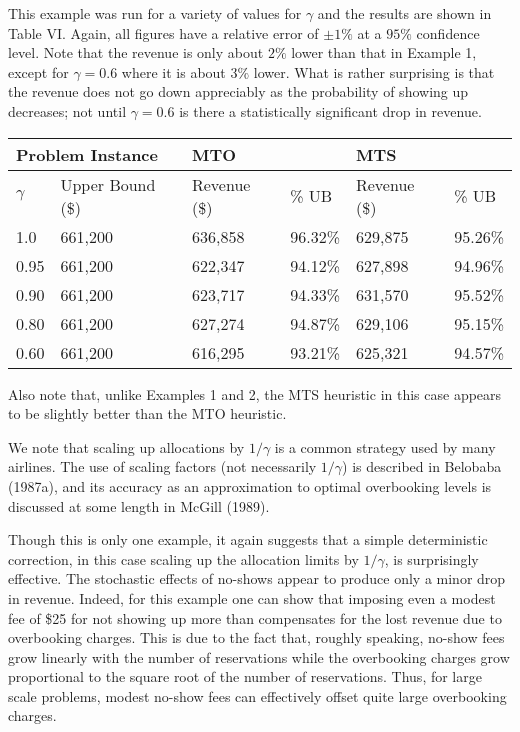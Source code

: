 This example was run for a variety of values for \(\gamma\) and the results are shown in Table VI. Again, all figures have a relative error of \(\pm 1\%\) at a \(95\%\) confidence level. Note that the revenue is only about \(2\%\) lower than that in Example 1, except for \(\gamma = 0.6\) where it is about \(3\%\) lower. What is rather surprising is that the revenue does not go down appreciably as the probability of showing up decreases; not until \(\gamma = 0.6\) is there a statistically significant drop in revenue.

\begin{longtable}{|l|l|l|l|l|l|}
\hline
\multicolumn{2}{|l|}{Problem Instance} & \multicolumn{2}{l|}{MTO} & \multicolumn{2}{l|}{MTS} \\
\hline
\(\gamma\) & Upper Bound (\$) & Revenue (\$) & \% UB & Revenue (\$) & \% UB \\
\hline
1.0 & 661,200 & 636,858 & 96.32\% & 629,875 & 95.26\% \\
\hline
0.95 & 661,200 & 622,347 & 94.12\% & 627,898 & 94.96\% \\
\hline
0.90 & 661,200 & 623,717 & 94.33\% & 631,570 & 95.52\% \\
\hline
0.80 & 661,200 & 627,274 & 94.87\% & 629,106 & 95.15\% \\
\hline
0.60 & 661,200 & 616,295 & 93.21\% & 625,321 & 94.57\% \\
\hline
\end{longtable}

Also note that, unlike Examples 1 and 2, the MTS heuristic in this case appears to be slightly better than the MTO heuristic.

We note that scaling up allocations by \(1 / \gamma\) is a common strategy used by many airlines. The use of scaling factors (not necessarily \(1 / \gamma\)) is described in Belobaba (1987a), and its accuracy as an approximation to optimal overbooking levels is discussed at some length in McGill (1989).

Though this is only one example, it again suggests that a simple deterministic correction, in this case scaling up the allocation limits by \(1 / \gamma\), is surprisingly effective. The stochastic effects of no-shows appear to produce only a minor drop in revenue. Indeed, for this example one can show that imposing even a modest fee of \$25 for not showing up more than compensates for the lost revenue due to overbooking charges. This is due to the fact that, roughly speaking, no-show fees grow linearly with the number of reservations while the overbooking charges grow proportional to the square root of the number of reservations. Thus, for large scale problems, modest no-show fees can effectively offset quite large overbooking charges.

